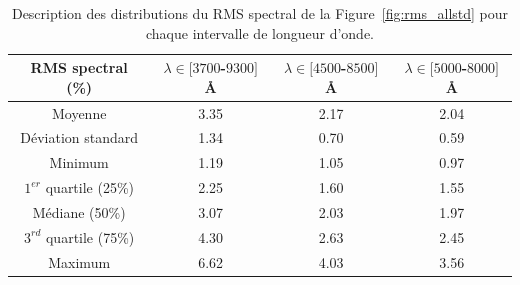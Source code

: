 \documentclass[../main/main.tex]{subfiles}
\begin{document}
\begin{table}[ht]
  \centerfloat
  \renewcommand{\arraystretch}{1.4}
  \caption[Description des distributions du RMS spectral des
  calibrations en flux.]{Description des distributions du RMS spectral de la
    Figure~\ref{fig:rms_allstd} pour chaque intervalle de longueur d'onde.}
  \label{tab:rms_allstd_detail}
  \begin{threeparttable}
    \begin{tabular}{cccc}
      \toprule
      \textbf{RMS spectral (\%)} & $\lambda \in [3700$-$9300]$\AA & $\lambda \in [4500$-$8500]$\AA  &$\lambda \in [5000$-$8000]$\AA \\
      \midrule
      Moyenne  &                                       3.35 &                                       2.17 &                                       2.04 \\
      Déviation standard   &                                       1.34 &                                       0.70 &                                       0.59 \\
      Minimum   &                                       1.19 &                                       1.05 &                                       0.97 \\
      $1^{er}$ quartile (25\%)   &                                       2.25 &                                       1.60 &                                       1.55 \\
      Médiane (50\%)   &                                       3.07 &                                       2.03 &                                       1.97 \\
      $3^{rd}$ quartile (75\%)   &                                       4.30 &                                       2.63 &                                       2.45 \\
      Maximum   &                                       6.62 &                                       4.03 &                                       3.56 \\
      \bottomrule
    \end{tabular}

  \end{threeparttable}
\end{table}

  

%
%
\end{document}
